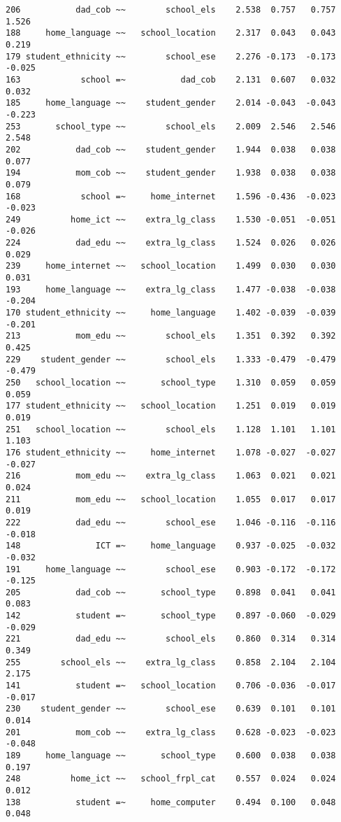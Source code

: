 \documentclass[
]{article}
\begin{document}
\begin{verbatim}
206           dad_cob ~~        school_els    2.538  0.757   0.757    1.526
188     home_language ~~   school_location    2.317  0.043   0.043    0.219
179 student_ethnicity ~~        school_ese    2.276 -0.173  -0.173   -0.025
163            school =~           dad_cob    2.131  0.607   0.032    0.032
185     home_language ~~    student_gender    2.014 -0.043  -0.043   -0.223
253       school_type ~~        school_els    2.009  2.546   2.546    2.548
202           dad_cob ~~    student_gender    1.944  0.038   0.038    0.077
194           mom_cob ~~    student_gender    1.938  0.038   0.038    0.079
168            school =~     home_internet    1.596 -0.436  -0.023   -0.023
249          home_ict ~~    extra_lg_class    1.530 -0.051  -0.051   -0.026
224           dad_edu ~~    extra_lg_class    1.524  0.026   0.026    0.029
239     home_internet ~~   school_location    1.499  0.030   0.030    0.031
193     home_language ~~    extra_lg_class    1.477 -0.038  -0.038   -0.204
170 student_ethnicity ~~     home_language    1.402 -0.039  -0.039   -0.201
213           mom_edu ~~        school_els    1.351  0.392   0.392    0.425
229    student_gender ~~        school_els    1.333 -0.479  -0.479   -0.479
250   school_location ~~       school_type    1.310  0.059   0.059    0.059
177 student_ethnicity ~~   school_location    1.251  0.019   0.019    0.019
251   school_location ~~        school_els    1.128  1.101   1.101    1.103
176 student_ethnicity ~~     home_internet    1.078 -0.027  -0.027   -0.027
216           mom_edu ~~    extra_lg_class    1.063  0.021   0.021    0.024
211           mom_edu ~~   school_location    1.055  0.017   0.017    0.019
222           dad_edu ~~        school_ese    1.046 -0.116  -0.116   -0.018
148               ICT =~     home_language    0.937 -0.025  -0.032   -0.032
191     home_language ~~        school_ese    0.903 -0.172  -0.172   -0.125
205           dad_cob ~~       school_type    0.898  0.041   0.041    0.083
142           student =~       school_type    0.897 -0.060  -0.029   -0.029
221           dad_edu ~~        school_els    0.860  0.314   0.314    0.349
255        school_els ~~    extra_lg_class    0.858  2.104   2.104    2.175
141           student =~   school_location    0.706 -0.036  -0.017   -0.017
230    student_gender ~~        school_ese    0.639  0.101   0.101    0.014
201           mom_cob ~~    extra_lg_class    0.628 -0.023  -0.023   -0.048
189     home_language ~~       school_type    0.600  0.038   0.038    0.197
248          home_ict ~~   school_frpl_cat    0.557  0.024   0.024    0.012
138           student =~     home_computer    0.494  0.100   0.048    0.048

\end{verbatim}
\end{document}

